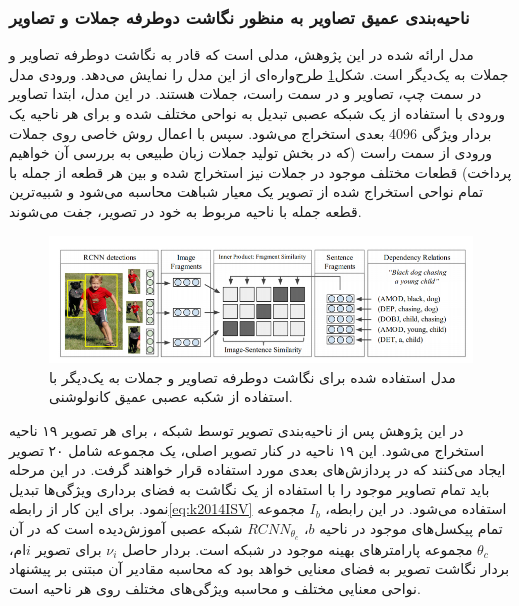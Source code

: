 \subsubsection[ناحیه‌بندی عمیق تصاویر به منظور نگاشت دوطرفه جملات و تصاویر]{ناحیه‌بندی عمیق تصاویر به منظور نگاشت دوطرفه جملات و تصاویر\cite{karpathy2014deep}}

مدل ارائه شده در این پژوهش، مدلی است که قادر به نگاشت دوطرفه تصاویر و جملات به یک‌دیگر است. شکل\ref{fig:k2014DM} طرح‌واره‌ای از این مدل را نمایش می‌دهد. ورودی مدل در سمت چپ، تصاویر و در سمت راست، جملات هستند. در این مدل، ابتدا تصاویر ورودی با استفاده از یک شبکه عصبی  تبدیل به نواحی مختلف شده و برای هر ناحیه یک بردار ویژگی 4096 بعدی استخراج می‌شود. سپس با اعمال روش خاصی روی جملات ورودی از سمت راست (که در بخش تولید جملات زبان طبیعی به بررسی آن خواهیم پرداخت) قطعات مختلف موجود در جملات نیز استخراج شده و بین هر قطعه از جمله با تمام نواحی استخراج شده از تصویر یک معیار شباهت محاسبه می‌شود و شبیه‌ترین قطعه جمله با ناحیه مربوط به خود در تصویر، جفت می‌شوند.

\begin{figure}[H]
\center
\includegraphics[scale=0.6]{./Imgs/karpathy2014deep_model.png}
\caption{مدل استفاده شده برای نگاشت دو‌طرفه تصاویر و جملات به یک‌دیگر با استفاده از شکبه‌ عصبی عمیق کانولوشنی.\cite{karpathy2014deep}}
\label{fig:k2014DM}
\end{figure}

در این پژوهش پس از ناحیه‌بندی تصویر توسط شبکه ، برای هر تصویر ۱۹ ناحیه استخراج می‌شود. این ۱۹ ناحیه در کنار تصویر اصلی، یک مجموعه شامل ۲۰ تصویر ایجاد می‌کنند که در پردازش‌های بعدی مورد استفاده قرار خواهند گرفت. در این مرحله باید تمام تصاویر موجود را با استفاده از یک نگاشت به فضای برداری ویژگی‌ها تبدیل نمود. برای این کار از رابطه\ref{eq:k2014ISV}
استفاده می‌شود. در این رابطه، $I_b$ مجموعه تمام پیکسل‌های موجود در ناحیه $b$،
$RCNN_{\theta_c}$
شبکه عصبی آموزش‌دیده است که در آن $\theta_c$ مجموعه پارامترهای بهینه موجود در شبکه است. بردار حاصل $\nu_i$ برای تصویر $i$ام، بردار نگاشت تصویر به فضای معنایی خواهد بود که محاسبه مقادیر آن مبتنی بر پیشنهاد نواحی معنایی مختلف و محاسبه ويژگی‌های مختلف روی هر ناحیه است.

